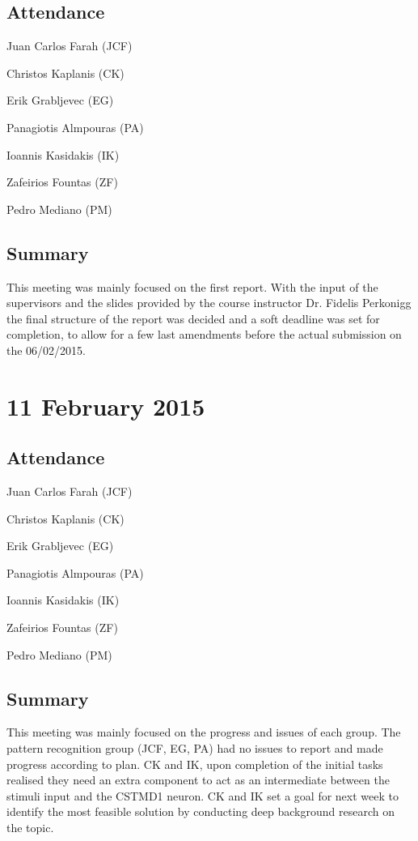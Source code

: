 \documentclass[a4paper,11pt]{article}
\begin{document}
\begin{appendices}
\subsection*{Attendance}
\begin{compactenum}
\item Juan Carlos Farah (JCF)
\item Christos Kaplanis (CK)
\item Erik Grabljevec (EG)
\item Panagiotis Almpouras (PA)
\item Ioannis Kasidakis (IK)
\item Zafeirios Fountas (ZF)
\item Pedro Mediano (PM)
\end{compactenum}

\subsection*{Summary}
This meeting was mainly focused on the first report. With the input of the supervisors and the slides provided by the course instructor Dr. Fidelis Perkonigg the final structure of the report was decided and a soft deadline was set for completion, to allow for a few last amendments before the actual submission on the 06/02/2015.

\maketitle
\section*{11 February 2015}
\subsection*{Attendance}
\begin{compactenum}
\item Juan Carlos Farah (JCF)
\item Christos Kaplanis (CK)
\item Erik Grabljevec (EG)
\item Panagiotis Almpouras (PA)
\item Ioannis Kasidakis (IK)
\item Zafeirios Fountas (ZF)
\item Pedro Mediano (PM)
\end{compactenum}

\subsection*{Summary}
This meeting was mainly focused on the progress and issues of each group. The pattern recognition group (JCF, EG, PA) had no issues to report and made progress according to plan. CK and IK, upon completion of the initial tasks realised they need an extra component to act as an intermediate between the stimuli input and the CSTMD1 neuron. CK and IK set a goal for next week to identify the most feasible solution by conducting deep background research on the topic.


\end{appendices}
\end{document}
